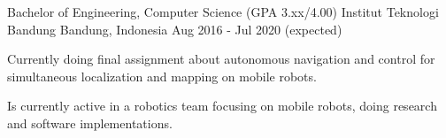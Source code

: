 

\begin{cventries}

  \cventry
    {Bachelor of Engineering, Computer Science (GPA 3.xx/4.00)} %
    {Institut Teknologi Bandung} %
    {Bandung, Indonesia} %
    {Aug 2016 - Jul 2020 (expected)} %
    {
   	  \begin{cvitems}
		  \item {Currently doing final assignment about autonomous navigation and control for simultaneous localization and mapping on mobile robots.}
          \item {Is currently active in a robotics team focusing on mobile robots, doing research and software implementations.}
   	  \end{cvitems}
    }

\end{cventries}
